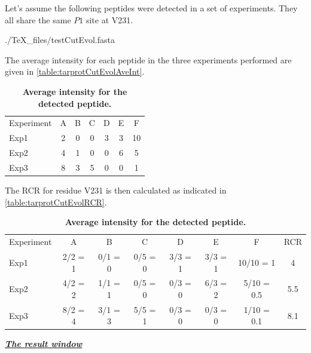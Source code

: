 Let's assume the following peptides were detected in a set of experiments. They all
share the same \(P1\) site at V231.

\begin{texshade}{./TeX_files/testCutEvol.fasta}
    \hideconsensus
\end{texshade}

The average intensity for each peptide in the three experiments performed are given
in \autoref{table:tarprotCutEvolAveInt}.

\begin{table}[h!]
    \centering
    \begin{tabular}{lcccccc}
        \hline
        Experiment & A & B & C & D & E & F \\
        Exp1 & 2 & 0 & 0 & 3 & 3 & 10 \\
        Exp2 & 4 & 1 & 0 & 0 & 6 & 5 \\
        Exp3 & 8 & 3 & 5 & 0 & 0 & 1 \\
        \hline
    \end{tabular}
    \caption[Average intensity for the detected peptide]{\textbf{Average intensity
    for the detected peptide.}}
    \label{table:tarprotCutEvolAveInt}
\end{table}

The RCR for residue V231 is then calculated as indicated in \autoref{table:tarprotCutEvolRCR}.

\begin{table}[h!]
    \centering
    \begin{tabular}{lccccccc}
        \hline
        Experiment & A       & B       & C       & D       & E       & F          & RCR\\
        Exp1       & 2/2 = 1 & 0/1 = 0 & 0/5 = 0 & 3/3 = 1 & 3/3 = 1 & 10/10 = 1  & 4  \\
        Exp2       & 4/2 = 2 & 1/1 = 1 & 0/5 = 0 & 0/3 = 0 & 6/3 = 2 & 5/10 = 0.5 & 5.5\\
        Exp3       & 8/2 = 4 & 3/1 = 3 & 5/5 = 1 & 0/3 = 0 & 0/3 = 0 & 1/10 = 0.1 & 8.1\\
        \hline
    \end{tabular}
    \caption[Average intensity for the detected peptide]{\textbf{Average intensity
    for the detected peptide.}}
    \label{table:tarprotCutEvolRCR}
\end{table}

\textit{\textbf{\underline{The result window}}}

